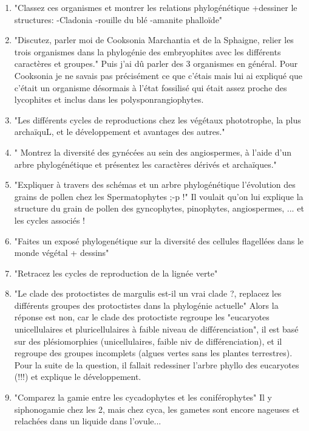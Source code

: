 \begin{enumerate}
	\item "Classez ces organismes et montrer les relations phylogénétique +dessiner le structures:
-Cladonia
-rouille du blé
-amanite phalloïde"


	\item "Discutez, parler moi de Cooksonia Marchantia et de la Sphaigne, relier les trois organismes dans la phylogénie des embryophites avec les différents caractères et groupes." Puis j’ai dû parler des 3 organismes en général. Pour Cooksonia je ne savais pas précisément ce que c'étais mais lui ai expliqué que c'était un organisme désormais à l'état fossilisé qui était assez proche des lycophites et inclus dans les polysponrangiophytes.

	\item "Les différents cycles de reproductions chez les végétaux phototrophe, la plus archaïquL, et le développement et avantages des autres."

	\item " Montrez la diversité des gynécées au sein des angiospermes, à l'aide d'un arbre phylogénétique et présentez les caractères dérivés et archaïques."

	\item "Expliquer à travers des schémas et un arbre phylogénétique l'évolution des grains de pollen chez les Spermatophytes ;-p !"  Il voulait qu'on lui explique la structure du grain de pollen des gyncophytes, pinophytes, angiospermes, ... et les cycles associés !

	\item "Faites un exposé phylogenétique sur la diversité des cellules flagellées dans le monde végétal + dessins"

	\item "Retracez les cycles de reproduction de la lignée verte"

	\item "Le clade des protoctistes de margulis est-il un vrai clade ?, replacez les différents groupes des protoctistes dans la phylogénie actuelle"
Alors la réponse est non, car le clade des protoctiste regroupe les "eucaryotes unicellulaires et pluricellulaires à faible niveau de différenciation", il est basé sur des plésiomorphies (unicellulaires, faible niv de différenciation), et il regroupe des groupes incomplets (algues vertes sans les plantes terrestres). Pour la suite de la question, il fallait redessiner l'arbre phyllo des eucaryotes (!!!) et explique le développement.

	\item "Comparez la gamie entre les cycadophytes et les coniférophytes" 
Il y siphonogamie chez les 2, mais chez cyca, les gametes sont encore nageuses et
relachées dans un liquide dans l'ovule...


\end{enumerate}
